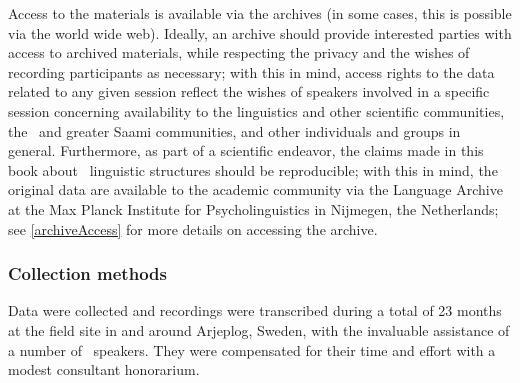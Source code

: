 Access to the materials is available via the archives (in some cases, this is possible via the world wide web). %
Ideally, an archive should provide interested parties with access to archived materials, while respecting the privacy and the wishes of recording participants as necessary; with this in mind, access rights to the data related to any given session reflect the wishes of speakers involved in a specific session concerning availability to the linguistics and other scientific communities, the \PS\ and greater Saami communities, and other individuals and groups in general. %
Furthermore, as part of a scientific endeavor, the claims made in this book about \PS\ linguistic structures should be reproducible; with this in mind, the original data are available to the academic community via the Language Archive at the Max Planck Institute for Psycholinguistics in Nijmegen, the Netherlands; see \SEC\ref{archiveAccess} for more details on accessing the archive. 


\subsubsection{Collection methods}\label{collectionMethods}
Data were collected and recordings were transcribed during a total of 23 months at the field site in and around Arjeplog, Sweden, %
with the invaluable assistance of a number of \PS\ speakers. They were compensated for their time and effort with a modest consultant honorarium. 


